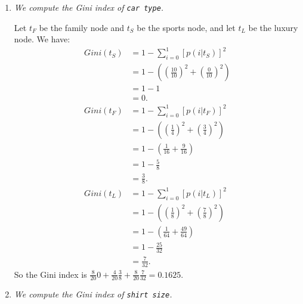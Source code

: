 \documentclass[12pt,oneside,reqno]{amsart}
\theoremstyle{plain}
\theoremstyle{definition}
\theoremstyle{remark}
\newcommand{\bb}{\vspace{3mm}}
\newcommand{\bee}{\begin{equation}\begin{aligned}}
\newcommand{\eee}{\end{aligned}\end{equation}}
\newcommand{\fracc}{\frac}
\newcommand{\lpar}{\left(}
\newcommand{\rpar}{\right)}
\newcommand{\inlinecode}{\texttt}
\begin{document}
\begin{enumerate}[label=\arabic*.]
\begin{enumerate}
\bb\bb

\item \textit{We compute the Gini index of \inlinecode{car type}. }

Let $t_F$ be the family node and $t_S$ be the sports node, and let $t_L$ be the luxury node. We have:
\bee
Gini(t_S) &= 1 - \sum_{i = 0}^1[p(i|t_S)]^2\\
&= 1 - \lpar \lpar \fracc{10}{10} \rpar ^2 + \lpar \fracc{0}{10} \rpar^2 \rpar\\
&= 1 - 1 \\
&= 0. \\
Gini(t_F) &= 1 - \sum_{i = 0}^1[p(i|t_F)]^2\\
&= 1 - \lpar \lpar \fracc{1}{4} \rpar ^2 + \lpar \fracc{3}{4} \rpar^2 \rpar\\
&= 1 - \lpar \fracc{1}{16} + \fracc{9}{16} \rpar \\
&= 1 - \fracc{5}{8}\\
&= \fracc{3}{8}. \\
Gini(t_L) &= 1 - \sum_{i = 0}^1[p(i|t_L)]^2\\
&= 1 - \lpar \lpar \fracc{1}{8} \rpar ^2 + \lpar \fracc{7}{8} \rpar^2 \rpar\\
&= 1 - \lpar \fracc{1}{64} + \fracc{49}{64} \rpar \\
&= 1 - \fracc{25}{32}\\
&= \fracc{7}{32}. 
\eee
So the Gini index is $\fracc{8}{20}0+ \fracc{4}{20}\fracc{3}{8} + \fracc{8}{20}\fracc{7}{32} = 0.1625$. 


\bb\bb






\item \textit{We compute the Gini index of \inlinecode{shirt size}. }


\end{enumerate}
\end{enumerate}
\end{document}
